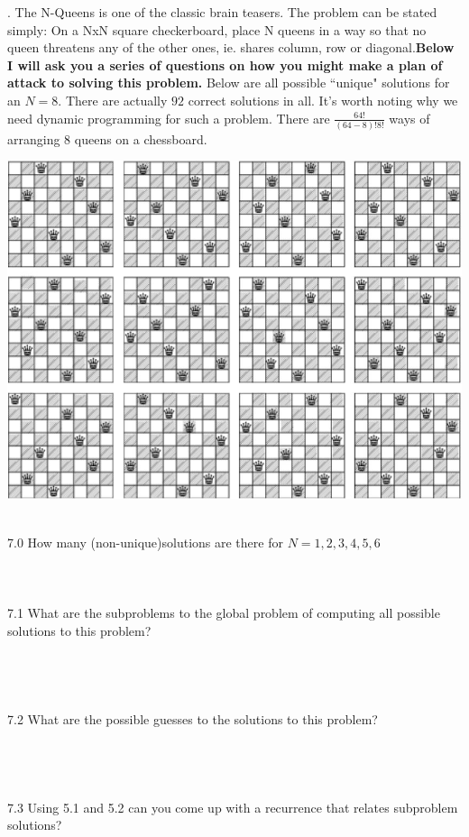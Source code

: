 \documentclass[12pt]{article}
\begin{document}
\newpage
{}. The N-Queens is one of the classic brain teasers. The problem can be stated simply:
On a NxN square checkerboard, place N queens in a way so that no queen threatens any 
of the other ones, ie. shares column, row or diagonal.\textbf{Below I will ask you a series of questions 
on how you might make a plan of attack to solving this problem.} Below are all possible ``unique" solutions
for an $N=8$. There are actually $92$ correct solutions in all. It's worth noting why we need dynamic
programming for such a problem. There are $\frac{64!}{(64-8)!8!}$ ways of arranging $8$ queens on a
chessboard.
\centerline{\includegraphics[scale = .25]{queen.jpg}}\\
7.0 How many (non-unique)solutions are there for $N = 1,2,3,4,5,6$\\\\\\\\
7.1 What are the subproblems to the global problem of computing all possible solutions to this problem?\\\\\\\\\\
7.2 What are the possible guesses to the solutions to this problem?\\\\\\\\\\
7.3 Using 5.1 and 5.2 can you come up with a recurrence that relates subproblem solutions?\\\\\\\\
\end{document}
